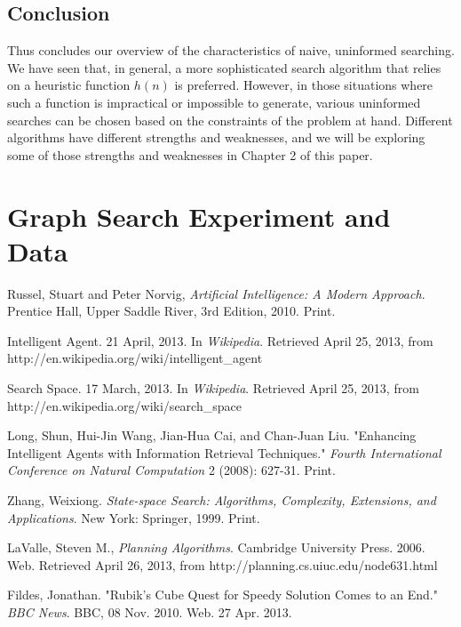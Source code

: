 \documentclass[a4paper,11pt]{report}
\begin{document}
\section{Conclusion}
Thus concludes our overview of the characteristics of naive, uninformed
searching.  We have seen that, in general, a more sophisticated search
algorithm that relies on a heuristic function $h(n)$ is preferred.  However, in
those situations where such a function is impractical or impossible to
generate, various uninformed searches can be chosen based on the constraints of
the problem at hand.  Different algorithms have different strengths and
weaknesses, and we will be exploring some of those strengths and weaknesses in
Chapter 2 of this paper.

\chapter{Graph Search Experiment and Data}


\begin{thebibliography}{9}

    Russel, Stuart and Peter Norvig,
    \textit{Artificial Intelligence: A Modern Approach}.
    Prentice Hall, Upper Saddle River,
    3rd Edition,
    2010. Print.

    Intelligent Agent. 21 April, 2013.  
    In \textit{Wikipedia}.  Retrieved April 25, 2013,
    from http://en.wikipedia.org/wiki/intelligent\_agent
  
    Search Space. 17 March, 2013.  
    In \textit{Wikipedia}.  Retrieved April 25, 2013,
    from http://en.wikipedia.org/wiki/search\_space
  
    Long, Shun, Hui-Jin Wang, Jian-Hua Cai, and Chan-Juan Liu. 
    "Enhancing Intelligent Agents with Information Retrieval Techniques." 
    \textit{Fourth International Conference on Natural Computation} 2 
    (2008): 627-31. Print.

    Zhang, Weixiong. \textit{State-space Search: Algorithms, Complexity,
    Extensions, and Applications}. New York: Springer, 1999. Print.

    LaValle, Steven M., \textit{Planning Algorithms}.
    Cambridge University Press. 2006. Web.
    Retrieved April 26, 2013, from http://planning.cs.uiuc.edu/node631.html
 
    Fildes, Jonathan. "Rubik's Cube Quest for Speedy Solution Comes to an End."
    \textit{BBC News}. BBC, 08 Nov. 2010. Web. 27 Apr. 2013.

\end{thebibliography}
\end{document}
